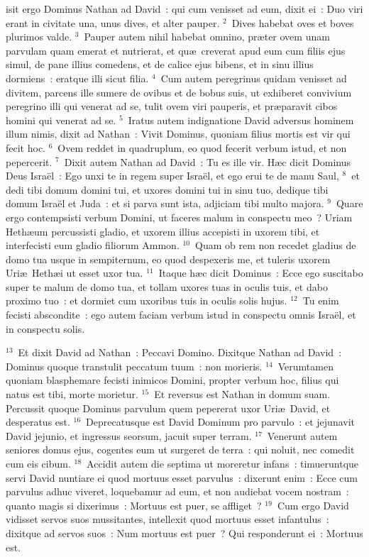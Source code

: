 \bchapter
{}isit ergo Dominus Nathan ad David~: qui cum venisset ad eum, dixit ei~: Duo viri erant in civitate una, unus dives, et alter pauper.
${}^{2}$~Dives habebat oves et boves plurimos valde.
${}^{3}$~Pauper autem nihil habebat omnino, pr\ae ter ovem unam parvulam quam emerat et nutrierat, et qu\ae\ creverat apud eum cum filiis ejus simul, de pane illius comedens, et de calice ejus bibens, et in sinu illius dormiens~: eratque illi sicut filia.
${}^{4}$~Cum autem peregrinus quidam venisset ad divitem, parcens ille sumere de ovibus et de bobus suis, ut exhiberet convivium peregrino illi qui venerat ad se, tulit ovem viri pauperis, et pr\ae paravit cibos homini qui venerat ad se.
${}^{5}$~Iratus autem indignatione David adversus hominem illum nimis, dixit ad Nathan~: Vivit Dominus, quoniam filius mortis est vir qui fecit hoc.
${}^{6}$~Ovem reddet in quadruplum, eo quod fecerit verbum istud, et non pepercerit.
${}^{7}$~Dixit autem Nathan ad David~: Tu es ille vir. H\ae c dicit Dominus Deus Isra\"el~: Ego unxi te in regem super Isra\"el, et ego erui te de manu Saul,
${}^{8}$~et dedi tibi domum domini tui, et uxores domini tui in sinu tuo, dedique tibi domum Isra\"el et Juda~: et si parva sunt ista, adjiciam tibi multo majora.
${}^{9}$~Quare ergo contempsisti verbum Domini, ut faceres malum in conspectu meo~? Uriam Heth\ae um percussisti gladio, et uxorem illius accepisti in uxorem tibi, et interfecisti eum gladio filiorum Ammon.
${}^{10}$~Quam ob rem non recedet gladius de domo tua usque in sempiternum, eo quod despexeris me, et tuleris uxorem Uri\ae\ Heth\ae i ut esset uxor tua.
${}^{11}$~Itaque h\ae c dicit Dominus~: Ecce ego suscitabo super te malum de domo tua, et tollam uxores tuas in oculis tuis, et dabo proximo tuo~: et dormiet cum uxoribus tuis in oculis solis hujus.
${}^{12}$~Tu enim fecisti abscondite~: ego autem faciam verbum istud in conspectu omnis Isra\"el, et in conspectu solis.


${}^{13}$~Et dixit David ad Nathan~: Peccavi Domino. Dixitque Nathan ad David~: Dominus quoque transtulit peccatum tuum~: non morieris.
${}^{14}$~Verumtamen quoniam blasphemare fecisti inimicos Domini, propter verbum hoc, filius qui natus est tibi, morte morietur.
${}^{15}$~Et reversus est Nathan in domum suam. Percussit quoque Dominus parvulum quem pepererat uxor Uri\ae\ David, et desperatus est.
${}^{16}$~Deprecatusque est David Dominum pro parvulo~: et jejunavit David jejunio, et ingressus seorsum, jacuit super terram.
${}^{17}$~Venerunt autem seniores domus ejus, cogentes eum ut surgeret de terra~: qui noluit, nec comedit cum eis cibum.
${}^{18}$~Accidit autem die septima ut moreretur infans~: timueruntque servi David nuntiare ei quod mortuus esset parvulus~: dixerunt enim~: Ecce cum parvulus adhuc viveret, loquebamur ad eum, et non audiebat vocem nostram~: quanto magis si dixerimus~: Mortuus est puer, se affliget~?
${}^{19}$~Cum ergo David vidisset servos suos mussitantes, intellexit quod mortuus esset infantulus~: dixitque ad servos suos~: Num mortuus est puer~? Qui responderunt ei~: Mortuus est.


